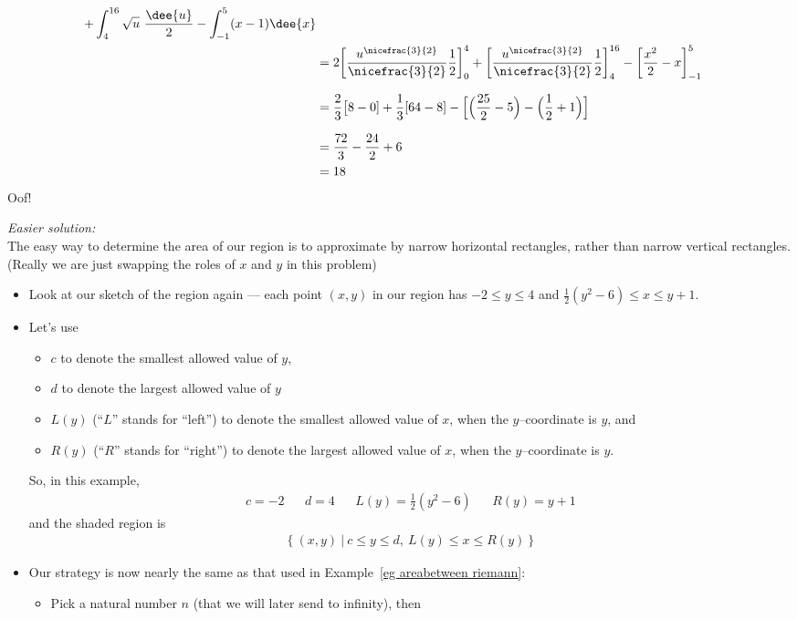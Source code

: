 \begin{eg}
\begin{itemize}
\begin{align*}
          +\int_4^{16} \sqrt{u}\ \frac{\dee{u}}{2}
          -\int_{-1}^5 (x-1)\dee{x} \\
  &= 2\bigg[\frac{ u^{\nicefrac{3}{2}} }{ \nicefrac{3}{2} }\frac{1}{2}\bigg]_0^4
 +\bigg[\frac{ u^{\nicefrac{3}{2}} }{ \nicefrac{3}{2} }\frac{1}{2}\bigg]_4^{16}
 -\bigg[\frac{x^2}{2}-x\bigg]_{-1}^5 \\[0.1in]
 & = \frac{2}{3}\big[8-0]
     +\frac{1}{3}[64-8]
     -\Big[\Big(\frac{25}{2}-5\Big)-\Big(\frac{1}{2}+1\Big)\Big] \\[0.1in]
 & = \frac{72}{3} -\frac{24}{2}+6 \\
&=18
\end{align*}
Oof!
\end{itemize}
\medskip\noindent\emph{Easier solution:}\\
The easy way to determine the area of our region is to approximate by narrow
horizontal rectangles, rather than narrow vertical rectangles. (Really we are just
swapping the roles of $x$ and $y$ in this problem)
\begin{itemize}
\item Look at our sketch of the region again --- each point $(x,y)$ in our
region has $-2\le y\le 4$ and $\frac{1}{2}(y^2-6)\le x \le y+1$.
\item Let's use
\begin{itemize}
\item
$c$ to denote the smallest allowed value of $y$,
\item
$d$ to denote the largest allowed value of $y$
\item
$L(y)$ (``$L$'' stands for ``left'') to denote the smallest allowed
value of $x$, when the $y$--coordinate is $y$, and
\item
$R(y)$ (``$R$'' stands for ``right'') to denote the largest allowed value
of $x$, when the $y$--coordinate is $y$.
\end{itemize}
So, in this example,
\begin{align*}
c=-2&& d=4 &&  L(y)=\frac{1}{2}(y^2-6) && R(y)=y+1
\end{align*}
and the shaded region is
\begin{align*}
\big\{\ (x,y)\ \big|\ c\le y\le d,\ L(y)\le x\le R(y)\ \big\}
\end{align*}
\item Our strategy is now nearly the same as that used in Example~\ref{eg areabetween
riemann}:
\begin{itemize}
 \item Pick a natural number $n$ (that we will later send to infinity), then

\end{itemize}
\end{itemize}
\end{eg}
